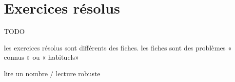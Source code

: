 \section{Exercices résolus}
TODO

les exercices résolus sont différents des fiches. les fiches sont des problèmes « connus » ou « habituels» 

lire un nombre / lecture robuste
